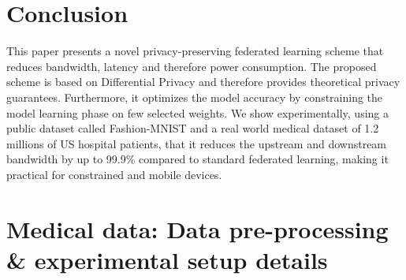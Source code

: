 \documentclass[accepted]{uai2021} %
\begin{document}
\section{Conclusion}


This paper presents a novel privacy-preserving federated learning scheme that reduces bandwidth, latency and
therefore power consumption.
The proposed scheme is based on Differential Privacy and therefore provides theoretical privacy guarantees. Furthermore, it optimizes
the model accuracy by constraining the model learning phase on few selected weights. We show experimentally, using a public 
dataset called Fashion-MNIST and a real world medical dataset of 1.2 millions of US hospital patients, that it reduces the 
upstream and downstream bandwidth by up to 99.9\% compared to standard federated learning, making it practical
for constrained and mobile devices.









\clearpage



\clearpage
\appendix


\section{Medical data: Data pre-processing \& experimental setup details}
\label{sec:app}
\end{document}
